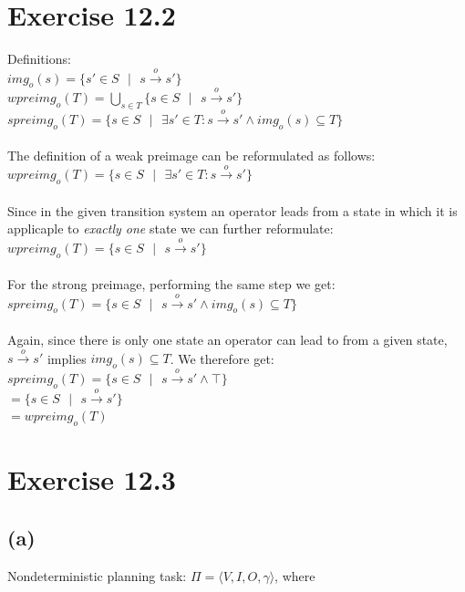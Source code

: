 \documentclass[11pt,a4paper]{article}
\begin{document}
\section*{Exercise 12.2}
Definitions:\\
$img_o(s)=\{s'\in S\text{ }|\text{ }s\stackrel{o}{\to}s'\}$\\
$wpreimg_o(T)=\bigcup_{s\in T}\{s\in S\text{ }|\text{ }s\stackrel{o}{\to}s'\}$\\
$spreimg_o(T)=\{s\in S\text{ }|\text{ }\exists s'\in T:s\stackrel{o}{\to}s'\land img_o(s)\subseteq T\}$\\
\\
The definition of a weak preimage can be reformulated as follows:\\
$wpreimg_o(T)=\{s\in S\text{ }|\text{ }\exists s'\in T:s\stackrel{o}{\to}s'\}$\\
\\
Since in the given transition system an operator leads from a state in which it is applicaple to \emph{exactly one} state we can further reformulate:\\
$wpreimg_o(T)=\{s\in S\text{ }|\text{ }s\stackrel{o}{\to}s'\}$\\
\\
For the strong preimage, performing the same step we get:\\
$spreimg_o(T)=\{s\in S\text{ }|\text{ }s\stackrel{o}{\to}s'\land img_o(s)\subseteq T\}$\\
\\
Again, since there is only one state an operator can lead to from a given state, $s\stackrel{o}{\to}s'$ implies $img_o(s)\subseteq T$. We therefore get:\\
$spreimg_o(T)=\{s\in S\text{ }|\text{ }s\stackrel{o}{\to}s'\land \top\}$\\
\hphantom{tabtabtabtab}$=\{s\in S\text{ }|\text{ }s\stackrel{o}{\to}s'\}$\\
\hphantom{tabtabtabtab}$=wpreimg_o(T)$\\

\section*{Exercise 12.3}
\subsection*{(a)}
Nondeterministic planning task: $\Pi = \langle V, I, O, \gamma\rangle$, where\\
\end{document}
